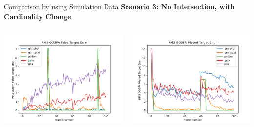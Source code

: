 \documentclass[12pt]{beamer}
\begin{document}
\begin{frame}{Comparison by using Simulation Data}
\textbf{Scenario 3: No Intersection, with Cardinality Change}
\begin{columns}[t]
  \begin{column}{0.5\linewidth}
      \centering
      \includegraphics[width=\linewidth,height=\textheight,keepaspectratio]{real_data/scenario3/gospa_false.png}\\
  \end{column}
    \begin{column}{0.5\linewidth}
      \centering
      \includegraphics[width=\linewidth,height=\textheight,keepaspectratio]{real_data/scenario3/missed.png}\\
  \end{column}
\end{columns}
\end{frame}
\end{document}
